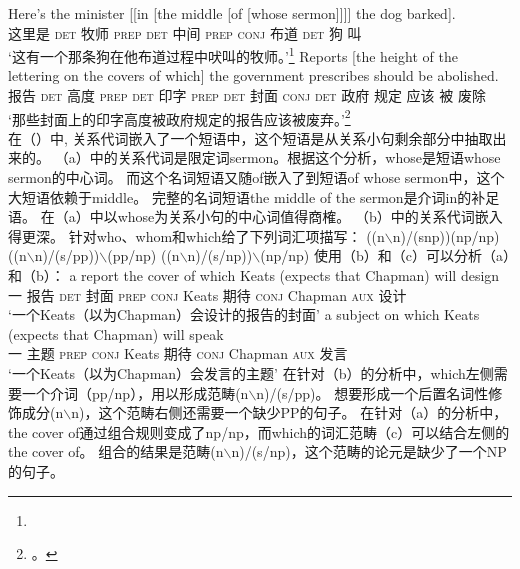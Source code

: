 \eal
\ex\label{Beispiel-Minister}
\gll Here's the minister [[in [the middle [of [whose sermon]]]] the dog barked]. \\
     这里是 \textsc{det} 牧师 \textsc{prep} \textsc{det} 中间 \textsc{prep} \textsc{conj} 布道 \textsc{det} 狗 叫 \\
\glt `这有一个那条狗在他布道过程中吠叫的牧师。'\footnote{}
\ex 
\gll Reports [the height of the lettering on the covers of which] the government prescribes should be abolished.\\
     报告 \textsc{det} 高度 \textsc{prep} \textsc{det} 印字 \textsc{prep} \textsc{det} 封面 \textsc{conj} \textsc{det} 政府 规定 应该 被 废除 \\
     \glt `那些封面上的印字高度被政府规定的报告应该被废弃。'\label{Ross-reports}\footnote{。\nocite{Ross86a-u}} \\
\zl
在（）中, 关系代词嵌入了一个短语中，这个短语是从关系小句剩余部分中抽取出来的。
（a）中的关系代词是限定词sermon。根据这个分析，whose是短语whose sermon的中心词。
而这个名词短语又随of嵌入了到短语of whose sermon中，这个大短语依赖于middle。
完整的名词短语the middle of the sermon是介词in的补足语。
在（a）中以whose为关系小句的中心词值得商榷。
（b）中的关系代词嵌入得更深。
\citet[]{Steedman97a}针对who、whom和which给了下列词汇项描写：
\eal
\label{le-relpron-Steedman}
\settowidth{}
\ex ((n$\backslash$n)/(s\bs np))\bs (np/np)       
\ex ((n$\backslash$n)/(s/pp))$\backslash$(pp/np)  
\ex ((n$\backslash$n)/(s/np))$\backslash$(np/np)  
\zl
使用（b）和（c）可以分析（a）和（b）：
\eal
\ex 
\gll a report the cover of which Keats (expects that Chapman) will design\\
一 报告 \textsc{det} 封面 \textsc{prep} \textsc{conj} Keats 期待 \textsc{conj} Chapman \textsc{aux} 设计\\
\glt `一个Keats（以为Chapman）会设计的报告的封面'
\ex 
\gll a subject on which Keats (expects that Chapman) will speak\\
一 主题 \textsc{prep} \textsc{conj} Keats 期待 \textsc{conj} Chapman \textsc{aux} 发言\\
\glt `一个Keats（以为Chapman）会发言的主题'
\zl
在针对（b）的分析中，which左侧需要一个介词（pp/np），用以形成范畴(n$\backslash$n)/(s/pp)。
想要形成一个后置名词性修饰成分(n$\backslash$n)，这个范畴右侧还需要一个缺少PP的句子。
在针对（a）的分析中，the cover of通过组合规则变成了np/np，而which的词汇范畴（c）可以结合左侧的the cover of。
组合的结果是范畴(n$\backslash$n)/(s/np)，这个范畴的论元是缺少了一个NP的句子。

